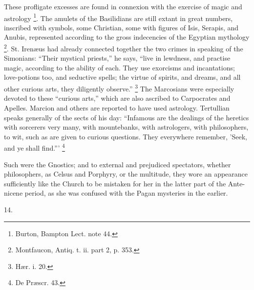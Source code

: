 These profligate excesses are found in connexion with
the exercise of magic and astrology \footnote{Burton, Bampton Lect. note
44.}. The amulets of the
Basilidians are still extant in great numbers, inscribed
with symbols, some Christian, some with figures of Isis,
Serapis, and Anubis, represented according to the gross
indecencies of the Egyptian mythology \footnote{Montfaucon, Antiq. t. ii.
part 2, p. 353.}. St. Irenæus had already
connected together the two crimes in speaking of the
Simonians: ``Their mystical priests,'' he says, ``live in lewdness, and practise magic, according to the
ability of each. They use exorcisms and incantations;
love-potions too, and seductive spells; the virtue of
spirits, and dreams, and all other curious arts, they
diligently observe.'' \footnote{Hær. i. 20.} The Marcosians were
especially devoted to these ``curious arts,''
which are also ascribed to Carpocrates and Apelles.
Marcion and others are reported to have used astrology.
Tertullian speaks generally of the sects of his day:
``Infamous are the dealings of the heretics with
sorcerers very many, with mountebanks, with astrologers,
with philosophers, to wit, such as are given to curious
questions. They everywhere remember, 'Seek, and ye shall
find.''' \footnote{De Præscr. 43.}

Such were the Gnostics; and to external and prejudiced
spectators, whether philosophers, as Celsus and Porphyry,
or the multitude, they wore an appearance sufficiently
like the Church to be mistaken for her in the latter part
of the Ante-nicene period, as she was confused with the
Pagan mysteries in the earlier.

14.

